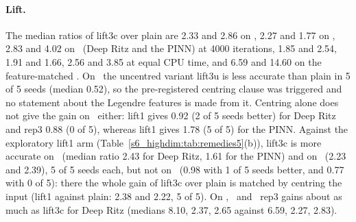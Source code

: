 \paragraph{Lift.} The median ratios of lift3c over plain are 2.33 and 2.86 on \Pone, 2.27 and
1.77 on \Pridge, 2.83 and 4.02 on \Pcospair\ (Deep Ritz and the PINN) at 4000 iterations, 1.85
and 2.54, 1.91 and 1.66, 2.56 and 3.85 at equal CPU time, and 6.59 and 14.60 on the
feature-matched \Ptwo. On \Pone\ the uncentred variant lift3u is less accurate than plain in 5 of
5 seeds (median 0.52), so the pre-registered centring clause was triggered and no statement about
the Legendre features is made from it. Centring alone does not give the gain on \Pone\ either:
lift1 gives 0.92 (2 of 5 seeds better) for Deep Ritz and rep3 0.88 (0 of 5), whereas lift1 gives
1.78 (5 of 5) for the PINN.
Against the exploratory lift1 arm (Table~\ref{s6_highdim:tab:remedies5}(b)), lift3c is more
accurate on \Pone\ (median ratio 2.43 for Deep Ritz, 1.61 for the PINN) and on \Pcospair\ (2.23
and 2.39), 5 of 5 seeds each, but not on \Pridge\ (0.98 with 1 of 5 seeds better, and 0.77 with 0
of 5): there the whole gain of lift3c over plain is matched by centring the input (lift1 against
plain: 2.38 and 2.22, 5 of 5). On \Ptwo, \Pridge\ and \Pcospair\ rep3 gains about as much as
lift3c for Deep Ritz (medians 8.10, 2.37, 2.65 against 6.59, 2.27, 2.83).

